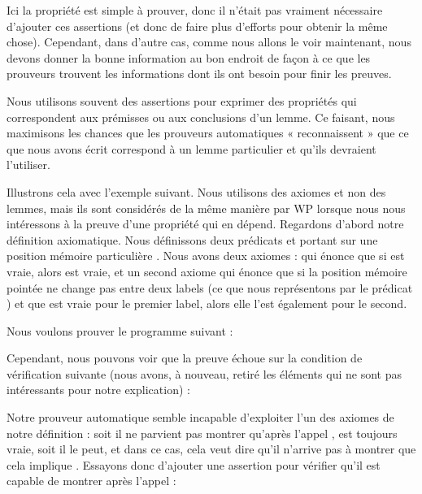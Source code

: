 Ici la propriété est simple à prouver, donc il n'était pas vraiment nécessaire
d'ajouter ces assertions (et donc de faire plus d'efforts pour obtenir la même
chose). Cependant, dans d'autre cas, comme nous allons le voir maintenant, nous
devons donner la bonne information au bon endroit de façon à ce que les prouveurs
trouvent les informations dont ils ont besoin pour finir les preuves.




Nous utilisons souvent des assertions pour exprimer des propriétés qui
correspondent aux prémisses ou aux conclusions d'un lemme. Ce faisant,
nous maximisons les chances que les prouveurs automatiques « reconnaissent »
que ce que nous avons écrit correspond à un lemme particulier et qu'ils
devraient l'utiliser.


Illustrons cela avec l'exemple suivant. Nous utilisons des axiomes et non des
lemmes, mais ils sont considérés de la même manière par WP lorsque nous nous
intéressons à la preuve d'une propriété qui en dépend. Regardons d'abord notre
définition axiomatique. Nous définissons deux prédicats  et
 portant sur une position mémoire particulière .
Nous avons deux axiomes :  qui énonce que si 
est vraie, alors  est vraie, et un second axiome 
qui énonce que si la position mémoire pointée ne change pas entre deux labels
(ce que nous représentons par le prédicat ) et que 
est vraie pour le premier label, alors elle l'est également pour le second.





Nous voulons prouver le programme suivant :




Cependant, nous pouvons voir que la preuve échoue sur la condition de vérification
suivante (nous avons, à nouveau, retiré les éléments qui ne sont pas intéressants
pour notre explication) :




Notre prouveur automatique semble incapable d'exploiter l'un des
axiomes de notre définition : soit il ne parvient pas montrer qu'après l'appel
,  est toujours vraie, soit il le peut, et
dans ce cas, cela veut dire qu'il n'arrive pas à montrer que cela implique
. Essayons donc d'ajouter une assertion pour vérifier qu'il
est capable de montrer  après l'appel :


